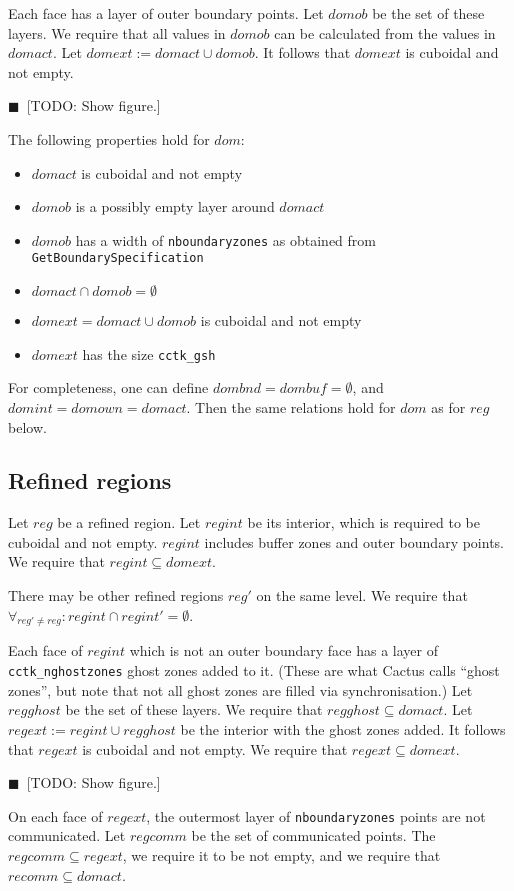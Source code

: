 \documentclass[oneside]{amsart}
\newcommand{\todo}[1]{{\color{blue}$\blacksquare$~\textsf{[TODO: #1]}}}
\newcommand{\code}[1]{\texttt{#1}}
\begin{document}
Each face has a layer of outer boundary points.  Let $domob$ be the
set of these layers.  We require that all values in $domob$ can be
calculated from the values in $domact$.  Let $domext := domact \cup
domob$.  It follows that $domext$ is cuboidal and not
empty.

\todo{Show figure.}

The following properties hold for $dom$:
\begin{itemize}
\item $domact$ is cuboidal and not empty
\item $domob$ is a possibly empty layer around $domact$
\item $domob$ has a width of \code{nboundaryzones} as obtained from
  \code{GetBoundarySpecification}
\item $domact \cap domob = \emptyset$
\item $domext = domact \cup domob$ is cuboidal and not empty
\item $domext$ has the size \code{cctk\_gsh}
\end{itemize}
For completeness, one can define $dombnd = dombuf = \emptyset$, and
$domint = domown = domact$.  Then the same relations hold for $dom$ as
for $reg$ below.

\subsection{Refined regions}

Let $reg$ be a refined region.  Let $regint$ be its interior, which is
required to be cuboidal and not empty.  $regint$ includes buffer zones
and outer boundary points.  We require that $regint \subseteq domext$.

There may be other refined regions $reg'$ on the same level.  We
require that $\forall_{reg' \ne reg}: regint \cap regint' =
\emptyset$.

Each face of $regint$ which is not an outer boundary face has a layer
of \code{cctk\_nghostzones} ghost zones added to it.  (These are what
Cactus calls ``ghost zones'', but note that not all ghost zones are
filled via synchronisation.)  Let $regghost$ be the set of these
layers.  We require that $regghost \subseteq domact$.  Let $regext :=
regint \cup regghost$ be the interior with the ghost zones added.  It
follows that $regext$ is cuboidal and not empty.  We require that
$regext \subseteq domext$.

\todo{Show figure.}

On each face of $regext$, the outermost layer of \code{nboundaryzones}
points are not communicated.  Let $regcomm$ be the set of communicated
points.  The $regcomm \subseteq regext$, we require it to be not
empty, and we require that $recomm \subseteq domact$.
\end{document}
